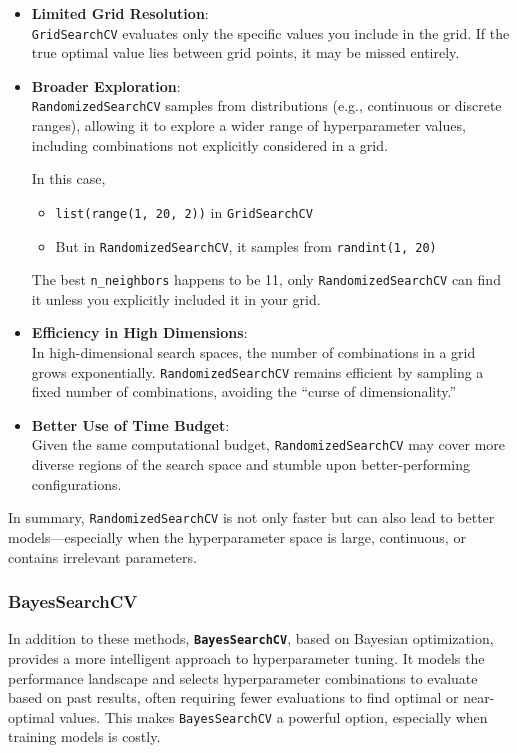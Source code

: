 \documentclass[
  letterpaper,
  DIV=11,
  numbers=noendperiod]{scrreprt}
\providecommand{\tightlist}{%
  \setlength{\itemsep}{0pt}\setlength{\parskip}{0pt}}\usepackage{longtable,booktabs,array}
\begin{document}
\begin{itemize}
\item
  \textbf{Limited Grid Resolution}:\\
  \texttt{GridSearchCV} evaluates only the specific values you include
  in the grid. If the true optimal value lies between grid points, it
  may be missed entirely.
\item
  \textbf{Broader Exploration}:\\
  \texttt{RandomizedSearchCV} samples from distributions (e.g.,
  continuous or discrete ranges), allowing it to explore a wider range
  of hyperparameter values, including combinations not explicitly
  considered in a grid.

  In this case,

  \begin{itemize}
  \tightlist
  \item
    \texttt{list(range(1,\ 20,\ 2))} in \texttt{GridSearchCV}
  \item
    But in \texttt{RandomizedSearchCV}, it samples from
    \texttt{randint(1,\ 20)}
  \end{itemize}

  The best \texttt{n\_neighbors} happens to be 11, only
  \texttt{RandomizedSearchCV} can find it unless you explicitly included
  it in your grid.
\item
  \textbf{Efficiency in High Dimensions}:\\
  In high-dimensional search spaces, the number of combinations in a
  grid grows exponentially. \texttt{RandomizedSearchCV} remains
  efficient by sampling a fixed number of combinations, avoiding the
  ``curse of dimensionality.''
\item
  \textbf{Better Use of Time Budget}:\\
  Given the same computational budget, \texttt{RandomizedSearchCV} may
  cover more diverse regions of the search space and stumble upon
  better-performing configurations.
\end{itemize}

In summary, \texttt{RandomizedSearchCV} is not only faster but can also
lead to better models---especially when the hyperparameter space is
large, continuous, or contains irrelevant parameters.

\subsubsection{BayesSearchCV}\label{bayessearchcv}

In addition to these methods, \textbf{\texttt{BayesSearchCV}}, based on
Bayesian optimization, provides a more intelligent approach to
hyperparameter tuning. It models the performance landscape and selects
hyperparameter combinations to evaluate based on past results, often
requiring fewer evaluations to find optimal or near-optimal values. This
makes \texttt{BayesSearchCV} a powerful option, especially when training
models is costly.
\end{document}
